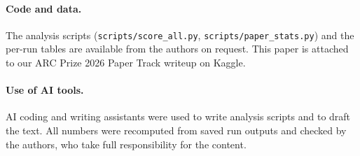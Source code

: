 \documentclass[11pt]{article}
\begin{document}
\paragraph{Code and data.}
The analysis scripts (\texttt{scripts/score\_all.py}, \texttt{scripts/paper\_stats.py}) and the per-run tables are available from the authors on request. This paper is attached to our ARC Prize 2026 Paper Track writeup on Kaggle.

\paragraph{Use of AI tools.}
AI coding and writing assistants were used to write analysis scripts and to draft the text. All numbers were recomputed from saved run outputs and checked by the authors, who take full responsibility for the content.



\end{document}
